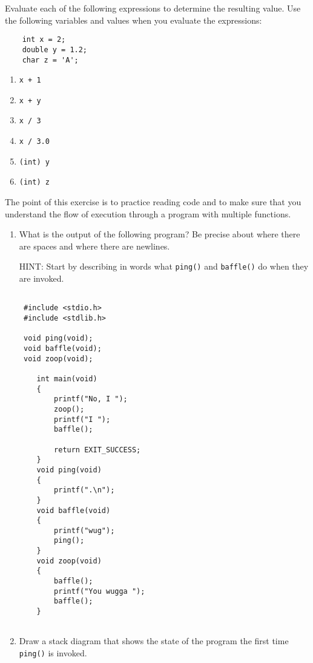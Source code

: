 

\begin{exercise}
	
Evaluate each of the following expressions to determine the resulting value. 
Use the following variables and values when you evaluate the expressions:
\begin{verbatim}
    int x = 2;
    double y = 1.2;
    char z = 'A';
\end{verbatim}
%
\begin{enumerate}
	\item {\tt x + 1}
	\item {\tt x + y}
	\item {\tt x / 3}
	\item {\tt x / 3.0}
	\item {\tt (int) y}
	\item {\tt (int) z}
\end{enumerate}
\end{exercise}

\begin{exercise}

The point of this exercise is to practice reading code and to
make sure that you understand the flow of execution through
a program with multiple functions.

\begin{enumerate}

\item What is the output of the following program?  Be precise
about where there are spaces and where there are newlines.

HINT: Start by describing in words what {\tt ping()} and
{\tt baffle()} do when they are invoked.

\begin{verbatim}

 #include <stdio.h>
 #include <stdlib.h>
 
 void ping(void);
 void baffle(void);
 void zoop(void);
 
    int main(void)
    {
        printf("No, I ");
        zoop();
        printf("I ");
        baffle();
        
        return EXIT_SUCCESS;
    }
    void ping(void)
    {
        printf(".\n"); 
    }
    void baffle(void)
    {
        printf("wug");
        ping(); 
    }
    void zoop(void)
    {
        baffle();
        printf("You wugga ");
        baffle();
    }
    
\end{verbatim}
%

\item Draw a stack diagram that shows the state of the program
the first time {\tt ping()} is invoked.

\end{enumerate}

\end{exercise}

